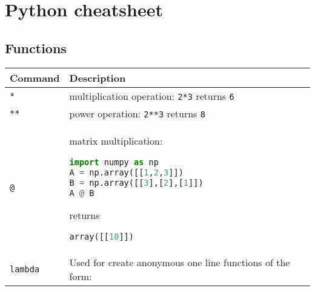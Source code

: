 \section{Python cheatsheet}\label{python-cheatsheet}

\subsection{Functions}\label{functions}

\begin{tabular}[]{@{}ll@{}}
\toprule
\begin{minipage}[b]{0.17\columnwidth}\raggedright\strut
Command\strut
\end{minipage} & \begin{minipage}[b]{0.77\columnwidth}\raggedright\strut
Description\strut
\end{minipage}\tabularnewline
\midrule
\begin{minipage}[t]{0.17\columnwidth}\raggedright\strut
\lstinline!*!\strut
\end{minipage} & \begin{minipage}[t]{0.77\columnwidth}\raggedright\strut
multiplication operation: \lstinline!2*3! returns \lstinline!6!\strut
\end{minipage}\tabularnewline
\begin{minipage}[t]{0.17\columnwidth}\raggedright\strut
\lstinline!**!\strut
\end{minipage} & \begin{minipage}[t]{0.77\columnwidth}\raggedright\strut
power operation: \lstinline!2**3! returns \lstinline!8!\strut
\end{minipage}\tabularnewline
\begin{minipage}[t]{0.17\columnwidth}\raggedright\strut
\lstinline!@!\strut
\end{minipage} & \begin{minipage}[t]{0.77\columnwidth}\raggedright\strut
matrix multiplication:

\begin{lstlisting}[language=Python]
import numpy as np
A = np.array([[1,2,3]])
B = np.array([[3],[2],[1]])
A @ B
\end{lstlisting}

returns

\begin{lstlisting}[language=Python]
array([[10]])
\end{lstlisting}
\strut
\end{minipage}\tabularnewline
\begin{minipage}[t]{0.17\columnwidth}\raggedright\strut
\lstinline!lambda!\strut
\end{minipage} & \begin{minipage}[t]{0.77\columnwidth}\raggedright\strut
Used for create anonymous one line functions of the form:


\end{minipage}
\end{tabular}
